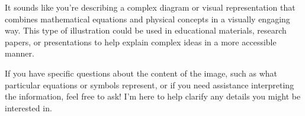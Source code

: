 It sounds like you're describing a complex diagram or visual representation that combines mathematical equations and physical concepts in a visually engaging way. This type of illustration could be used in educational materials, research papers, or presentations to help explain complex ideas in a more accessible manner.

If you have specific questions about the content of the image, such as what particular equations or symbols represent, or if you need assistance interpreting the information, feel free to ask! I'm here to help clarify any details you might be interested in.